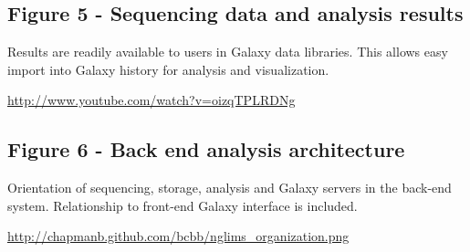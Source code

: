 \documentclass[10pt]{bmc_article}
\newenvironment{bmcformat}{\begin{raggedright}\baselineskip20pt\sloppy\setboolean{publ}{false}}{\end{raggedright}\baselineskip20pt\sloppy}
\begin{document}
\begin{bmcformat}
\subsection*{Figure 5 - Sequencing data and analysis results}
Results are readily available to users in Galaxy data libraries. This
allows easy import into Galaxy history for analysis and visualization.

\url{http://www.youtube.com/watch?v=oizqTPLRDNg}

\subsection*{Figure 6 - Back end analysis architecture}
Orientation of sequencing, storage, analysis and Galaxy servers in the
back-end system. Relationship to front-end Galaxy interface is
included.

\url{http://chapmanb.github.com/bcbb/nglims_organization.png}

\end{bmcformat}
\end{document}

